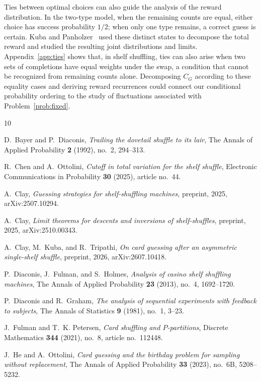 \documentclass[11pt,reqno]{amsart}
\numberwithin{equation}{section}
\theoremstyle{definition}
\theoremstyle{remark}
\begin{document}
Ties between optimal choices can also guide the analysis of the reward distribution. In the two-type model, when the remaining counts are equal, either choice has success probability $1/2$; when only one type remains, a correct guess is certain. Kuba and Panholzer~\cite{KPColors} used these distinct states to decompose the total reward and studied the resulting joint distributions and limits. Appendix~\ref{app:ties} shows that, in shelf shuffling, ties can also arise when two sets of completions have equal weights under the swap, a condition that cannot be recognized from remaining counts alone. Decomposing $C_G$ according to these equality cases and deriving reward recurrences could connect our conditional probability ordering to the study of fluctuations associated with Problem~\ref{prob:fixed}.
\clearpage
\begingroup
\raggedright
\begin{thebibliography}{10}

D.~Bayer and P.~Diaconis, \emph{{Trailing the dovetail shuffle to its lair}},
  The Annals of Applied Probability \textbf{2} (1992), no.~2, 294--313.

R.~Chen and A.~Ottolini, \emph{{Cutoff in total variation for the shelf
  shuffle}}, Electronic Communications in Probability \textbf{30} (2025),
  article no.~44.

A.~Clay, \emph{{Guessing strategies for shelf-shuffling machines}}, preprint,
  2025, arXiv:2507.10294.

A.~Clay, \emph{{Limit theorems for descents and inversions of shelf-shuffles}},
  preprint, 2025, arXiv:2510.00343.

A.~Clay, M.~Kuba, and R.~Tripathi, \emph{{On card guessing after an asymmetric
  single-shelf shuffle}}, preprint, 2026, arXiv:2607.10418.

P.~Diaconis, J.~Fulman, and S.~Holmes, \emph{{Analysis of casino shelf
  shuffling machines}}, The Annals of Applied Probability \textbf{23} (2013),
  no.~4, 1692--1720.

P.~Diaconis and R.~Graham, \emph{{The analysis of sequential experiments with
  feedback to subjects}}, The Annals of Statistics \textbf{9} (1981), no.~1,
  3--23.

J.~Fulman and T.~K. Petersen, \emph{{Card shuffling and $P$-partitions}},
  Discrete Mathematics \textbf{344} (2021), no.~8, article no.~112448.

J.~He and A.~Ottolini, \emph{{Card guessing and the birthday problem for
  sampling without replacement}}, The Annals of Applied Probability \textbf{33}
  (2023), no.~6B, 5208--5232.


\end{thebibliography}
\end{document}
